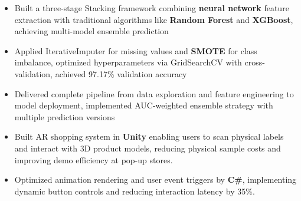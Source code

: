 \documentclass{resume}
\begin{document}
\begin{itemize}
  \item Built a three-stage Stacking framework combining \textbf{neural network} feature extraction with traditional algorithms like \textbf{Random Forest} and \textbf{XGBoost}, achieving multi-model ensemble prediction
  \item Applied IterativeImputer for missing values and \textbf{SMOTE} for class imbalance, optimized hyperparameters via GridSearchCV with cross-validation, achieved 97.17\% validation accuracy
  \item Delivered complete pipeline from data exploration and feature engineering to model deployment, implemented AUC-weighted ensemble strategy with multiple prediction versions
\end{itemize}


\begin{itemize}
  \item Built AR shopping system in \textbf{Unity} enabling users to scan physical labels and interact with 3D product models, reducing physical sample costs and improving demo efficiency at pop-up stores.
  \item Optimized animation rendering and user event triggers by \textbf{C\#}, implementing dynamic button controls and reducing interaction latency by 35\%.
\end{itemize}
\end{document}
